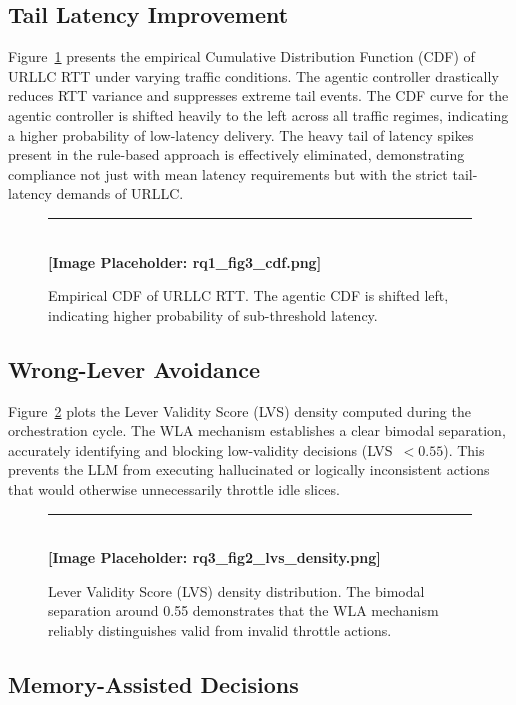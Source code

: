 \documentclass[12pt]{article}
\begin{document}
\subsection{Tail Latency Improvement}

Figure~\ref{fig:rtt_cdf} presents the empirical Cumulative Distribution
Function (CDF) of URLLC RTT under varying traffic conditions. The agentic
controller drastically reduces RTT variance and suppresses extreme tail events.
The CDF curve for the agentic controller is shifted heavily to the left across
all traffic regimes, indicating a higher probability of low-latency delivery. The
heavy tail of latency spikes present in the rule-based approach is
effectively eliminated, demonstrating compliance not just with mean
latency requirements but with the strict tail-latency demands of URLLC.

\begin{figure}[H]
\centering
\rule{\textwidth}{6cm} \\ \vspace{0.5em}\centering\textbf{[Image Placeholder: rq1\_fig3\_cdf.png]}
\caption{Empirical CDF of URLLC RTT. The agentic CDF is shifted left,
indicating higher probability of sub-threshold latency.}
\label{fig:rtt_cdf}
\end{figure}

\subsection{Wrong-Lever Avoidance}

Figure~\ref{fig:lvs} plots the Lever Validity Score (LVS) density
computed during the orchestration cycle. The WLA mechanism establishes a
clear bimodal separation, accurately identifying and blocking low-validity
decisions (LVS~$< 0.55$). This prevents the LLM from executing
hallucinated or logically inconsistent actions that would otherwise
unnecessarily throttle idle slices.

\begin{figure}[H]
\centering
\rule{\textwidth}{6cm} \\ \vspace{0.5em}\centering\textbf{[Image Placeholder: rq3\_fig2\_lvs\_density.png]}
\caption{Lever Validity Score (LVS) density distribution. The bimodal
separation around 0.55 demonstrates that the WLA mechanism reliably
distinguishes valid from invalid throttle actions.}
\label{fig:lvs}
\end{figure}

\subsection{Memory-Assisted Decisions}
\end{document}

